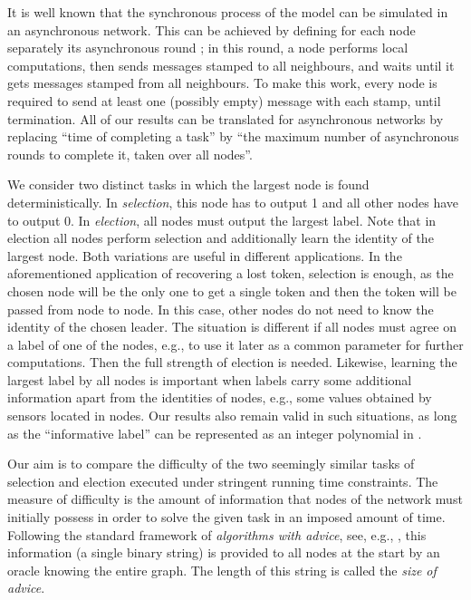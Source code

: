 \documentclass[11pt]{article}
\begin{document}
It is well known that the synchronous process of the   model can be simulated in an asynchronous network. This can be achieved 
by defining for each node separately its asynchronous round ;
in this round, a node performs local computations, then sends messages stamped  to all neighbours, and  waits until it gets messages stamped  from all neighbours.
To make this work, every node is required to send at least one (possibly empty) message with each stamp, until termination.
All of our results can be translated for asynchronous networks by replacing ``time of completing a task''  by ``the maximum number of asynchronous rounds  to complete it, taken over all nodes''.

We consider two distinct tasks in which the largest node is found deterministically.
In {\em selection}, this node has to output 1 and all other nodes have to output 0. In {\em election}, all nodes must output the largest label.
Note that in election all nodes perform selection and additionally learn the identity of the largest node.
Both variations are useful in different applications. In the aforementioned application of recovering a lost
token, selection is enough, as the chosen node will be the only one to get a single token and then the token will be passed from node to node. In this case,
other nodes do not need to know the identity of the chosen leader. The situation is different if all nodes must agree on a label of one of the nodes, e.g., to use it later
as a common parameter for further computations. Then the full strength of election is needed. Likewise, learning the largest label by all nodes is important when
labels carry some additional information apart from the identities of nodes, e.g., some values obtained by sensors located in nodes. Our results also remain valid
in such situations, as long as the  ``informative label'' can be represented as an integer polynomial in .  

Our aim is to compare the difficulty of the two seemingly similar tasks of selection and election executed under stringent running time constraints. 
The measure of difficulty is the amount of information
 that nodes of the network must initially possess in order to solve the given task in an imposed amount of time. Following the standard framework of {\em algorithms
with advice}, see, e.g.,   \cite{DP,EFKR,FGIP,FKL,FP,IKP,SN}, this information (a single binary string) is provided to all nodes at the start by an oracle knowing the entire graph. The length of this string is called the {\em size of advice}. 
\end{document}

